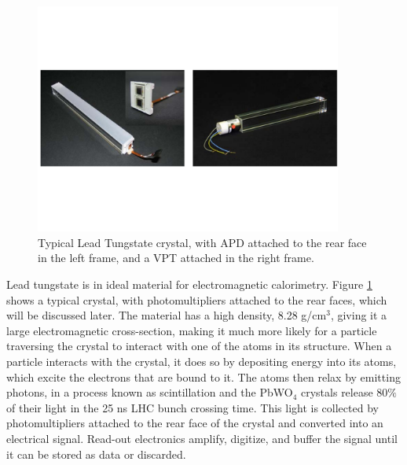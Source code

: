 \begin{figure}[h]
   \centering
  \includegraphics[width=0.9\textwidth]{Figures/CMS_Diagrams/ECAL__Xtal.pdf}
  \caption{Typical Lead Tungstate crystal, with APD attached to the
    rear face in the left frame, and a VPT attached in the right
    frame. } \label{fig:ecal_xtals}
\end{figure}

\par Lead tungstate is in ideal material for electromagnetic
calorimetry.  Figure \ref{fig:ecal_xtals} shows a typical crystal,
with photomultipliers attached to the rear faces, which will be
discussed later.  The material has a high density, 8.28 g/cm$^{3}$, giving it a
large electromagnetic cross-section, making it much more likely for a
particle traversing the crystal to interact with one of the atoms in
its structure.  When a particle interacts with the crystal, it does so
by depositing energy into its atoms, which excite the electrons that
are bound to it.  The atoms then relax by emitting photons, in a
process known as scintillation and the PbWO$_{4}$ crystals release
80$\%$ of their light in the 25 ns LHC bunch crossing time.  This
light is collected by photomultipliers attached to the rear face of
the crystal and converted into an electrical signal.  Read-out
electronics amplify, digitize, and buffer the signal until it can be
stored as data or discarded.  

